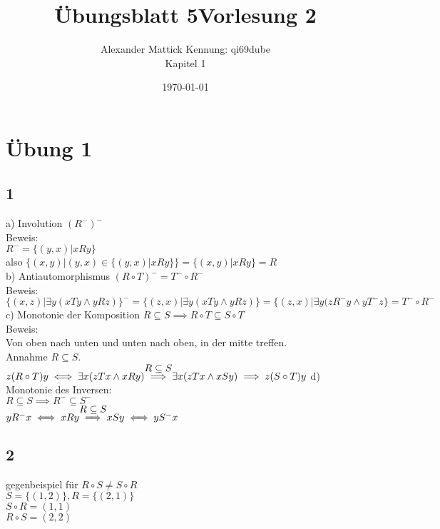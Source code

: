 \documentclass{article}
\title{Übungsblatt 5}
\author{
Alexander Mattick Kennung: qi69dube\\
Kapitel 1
}
\date{\today}
\title{Vorlesung 2}
\begin{document}
	\maketitle
	\section{Übung 1}
	\subsection{1}
	a) Involution $(R^-)^-$\\
	Beweis:\\
	$R^- = \{(y,x)|xRy\}$\\
	also $\{(x,y)|(y,x)\in \{(y,x)| xRy\}\}=\{(x,y)| xRy\}=R$\\
	b) Antiautomorphismus $(R\circ T)^- = T^-\circ R^-$\\
	Beweis:\\
	$\{(x,z)|\exists y( xTy\land yRz)\}^- = \{(z,x)|\exists y( xTy\land yRz)\} =\{(z,x)|\exists y(zR^-y\land yT^-z\} = T^-\circ R^-$\\
	c) Monotonie der Komposition $R\subseteq S\implies R\circ T\subseteq S\circ T$\\
	Beweis:\\
	Von oben nach unten und unten nach oben, in der mitte treffen.\\
	Annahme $R\subseteq S$.\\
	$z(R\circ T)y\\\iff \exists x (zTx\land xRy)\\
	\stackon{$\implies$}{$R\subseteq S$}\\
	\exists x (zTx\land xSy)\\
	\implies z(S\circ T)y$
	d) Monotonie des Inversen:\\
	$R\subseteq S\implies R^-\subseteq S^-$\\
	$yR^-x\iff xRy \stackon{$\implies$}{$R\subseteq S$} xSy\iff yS^-x$\\
	\subsection{2}
	gegenbeispiel für $R\circ S\neq S\circ R$\\
	$S=\{(1,2)\}, R=\{(2,1)\}$\\
	$S\circ R = (1,1)$\\
	$R\circ S = (2,2)$\\
\end{document}
